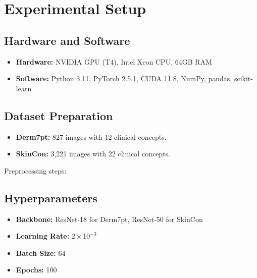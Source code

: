 \documentclass[a4paper,11pt]{article}
\begin{document}
\section{Experimental Setup}
\subsection{Hardware and Software}
\begin{itemize}
    \item \textbf{Hardware:} NVIDIA GPU (T4), Intel Xeon CPU, 64GB RAM
    \item \textbf{Software:} Python 3.11, PyTorch 2.5.1, CUDA 11.8, NumPy, pandas, scikit-learn
\end{itemize}

\subsection{Dataset Preparation}
\begin{itemize}
    \item \textbf{Derm7pt:} 827 images with 12 clinical concepts.\cite{kawahara2019seven}
    \item \textbf{SkinCon:} 3,221 images with 22 clinical concepts. \cite{patricio2023coherent}
\end{itemize}

Preprocessing steps:
\subsection{Hyperparameters}
\begin{itemize}
    \item \textbf{Backbone:} ResNet-18 for Derm7pt, ResNet-50 for SkinCon
    \item \textbf{Learning Rate:} \( 2 \times 10^{-3} \)
    \item \textbf{Batch Size:} 64
    \item \textbf{Epochs:} 100
\end{itemize}
            
\end{document}
